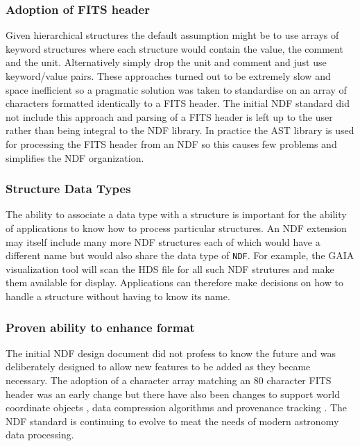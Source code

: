 \documentclass[final,authoryear,5p,times,twocolumn]{elsarticle}
\begin{document}
{\subsubsection{Adoption of FITS header}

Given hierarchical structures the default assumption might be to use
arrays of keyword structures where each structure would contain the
value, the comment and the unit. Alternatively simply drop the unit
and comment and just use keyword/value pairs. These approaches turned
out to be extremely slow and space inefficient so a pragmatic solution
was taken to standardise on an array of characters formatted
identically to a FITS header. The initial NDF standard did not include
this approach and parsing of a FITS header is left up to the user
rather than being integral to the NDF library. In practice the AST
library \citep{1998ASPC..145...41W} is used for processing the FITS
header from an NDF so this causes few problems and simplifies the NDF
organization.

\subsubsection{Structure Data Types}

The ability to associate a data type with a structure is important for
the ability of applications to know how to process particular
structures. An NDF extension may itself include many more NDF
structures each of which would have a different name but would also
share the data type of \texttt{NDF}. For example, the GAIA
visualization tool \citep{2009ASPC..411..575D} will scan the HDS file
for all such NDF strutures and make them available for
display. Applications can therefore make decisions on how to handle a
structure without having to know its name.

\subsubsection{Proven ability to enhance format}

The initial NDF design document did not profess to know the future and
was deliberately designed to allow new features to be added as they
became necessary. The adoption of a character array matching an 80
character FITS header was an early change but there have also been
changes to support world coordinate objects
\citep{2001ASPC..238..129B}, data compression algorithms
\citep{2008ASPC..394..650C} and provenance tracking
\citep{2009ASPC..411..418J}. The NDF standard is continuing to evolve
to meat the needs of modern astronomy data processing.

}
\end{document}
